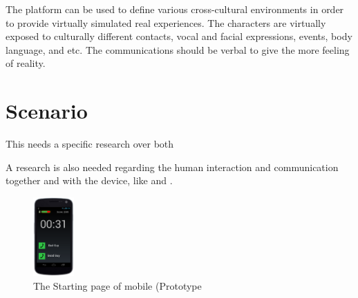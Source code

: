 \documentclass[conference]{IEEEtran}
\begin{document}
The platform can be used to define various cross-cultural environments in order to
provide virtually simulated real experiences. The characters are virtually exposed to culturally
different contacts, vocal and facial expressions, events, body language, and etc.
The communications should be verbal to give the more feeling of reality.




\section{Scenario}
\cite{scenario}

This needs a specific research over both 

A research is also needed regarding the human interaction and communication
together and with the device, like \cite{behavior} and \cite{facial-vocal}.

\cite{scenario-adapt}
\cite{scenario-repurposing}


\cite{scenario-gen}
\cite{l-system}

\begin{figure}
 \centering
\includegraphics[width=0.14\textwidth]{kar}
\caption{The Starting page of mobile (Prototype}
\label{diagram}
\end{figure}




\end{document}
